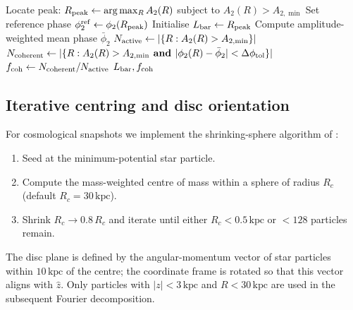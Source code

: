 \documentclass[fleqn,usenatbib]{mnras}
\newcommand{\kpc}{\,\mathrm{kpc}}
\begin{document}
\begin{algorithm}[t]
  \caption{Phase-coherent bar length (\textsc{bar\_length})}
  \label{alg:bar_length}
  \DontPrintSemicolon
  \BlankLine
  Locate peak: $R_{\rm peak} \leftarrow \arg\max_R A_2(R)$
        subject to $A_2(R) > A_{2,\min}$\;
  Set reference phase $\phi_2^{\rm ref} \leftarrow \phi_2(R_{\rm peak})$\;
  Initialise $L_{\rm bar} \leftarrow R_{\rm peak}$\;
  \BlankLine
  Compute amplitude-weighted mean phase $\bar\phi_2$\;
  $N_{\rm active}  \leftarrow |\{R : A_2(R) > A_{2,\min}\}|$\;
  $N_{\rm coherent} \leftarrow |\{R : A_2(R) > A_{2,\min}
                              \KwSty{ and } |\phi_2(R) - \bar\phi_2| < \Delta\phi_{\rm tol}\}|$\;
  $f_{\rm coh} \leftarrow N_{\rm coherent} / N_{\rm active}$\;
  \Return $L_{\rm bar}, f_{\rm coh}$
\end{algorithm}

\subsection{Iterative centring and disc orientation}

For cosmological snapshots we implement the shrinking-sphere
algorithm of \citet{2003MNRAS.338...14P}:
\begin{enumerate}
  \item Seed at the minimum-potential star particle.
  \item Compute the mass-weighted centre of mass within a sphere
        of radius $R_c$ (default $R_c = 30\kpc$).
  \item Shrink $R_c \to 0.8\,R_c$ and iterate until either
        $R_c < 0.5\kpc$ or $<128$ particles remain.
\end{enumerate}
The disc plane is defined by the angular-momentum vector of star
particles within $10\kpc$ of the centre; the coordinate frame is
rotated so that this vector aligns with $\hat{z}$.  Only particles
with $|z| < 3\kpc$ and $R < 30\kpc$ are used in the subsequent
Fourier decomposition.
\end{document}
